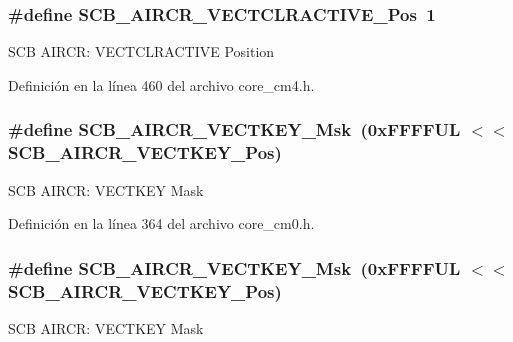 \subsubsection[{\texorpdfstring{S\+C\+B\+\_\+\+A\+I\+R\+C\+R\+\_\+\+V\+E\+C\+T\+C\+L\+R\+A\+C\+T\+I\+V\+E\+\_\+\+Pos}{SCB_AIRCR_VECTCLRACTIVE_Pos}}]{\setlength{\rightskip}{0pt plus 5cm}\#define S\+C\+B\+\_\+\+A\+I\+R\+C\+R\+\_\+\+V\+E\+C\+T\+C\+L\+R\+A\+C\+T\+I\+V\+E\+\_\+\+Pos~1}\hypertarget{group___c_m_s_i_s___s_c_b_gaa30a12e892bb696e61626d71359a9029}{}\label{group___c_m_s_i_s___s_c_b_gaa30a12e892bb696e61626d71359a9029}
S\+CB A\+I\+R\+CR\+: V\+E\+C\+T\+C\+L\+R\+A\+C\+T\+I\+VE Position 

Definición en la línea 460 del archivo core\+\_\+cm4.\+h.

\subsubsection[{\texorpdfstring{S\+C\+B\+\_\+\+A\+I\+R\+C\+R\+\_\+\+V\+E\+C\+T\+K\+E\+Y\+\_\+\+Msk}{SCB_AIRCR_VECTKEY_Msk}}]{\setlength{\rightskip}{0pt plus 5cm}\#define S\+C\+B\+\_\+\+A\+I\+R\+C\+R\+\_\+\+V\+E\+C\+T\+K\+E\+Y\+\_\+\+Msk~(0x\+F\+F\+F\+F\+U\+L $<$$<$ S\+C\+B\+\_\+\+A\+I\+R\+C\+R\+\_\+\+V\+E\+C\+T\+K\+E\+Y\+\_\+\+Pos)}\hypertarget{group___c_m_s_i_s___s_c_b_ga90c7cf0c490e7ae55f9503a7fda1dd22}{}\label{group___c_m_s_i_s___s_c_b_ga90c7cf0c490e7ae55f9503a7fda1dd22}
S\+CB A\+I\+R\+CR\+: V\+E\+C\+T\+K\+EY Mask 

Definición en la línea 364 del archivo core\+\_\+cm0.\+h.

\subsubsection[{\texorpdfstring{S\+C\+B\+\_\+\+A\+I\+R\+C\+R\+\_\+\+V\+E\+C\+T\+K\+E\+Y\+\_\+\+Msk}{SCB_AIRCR_VECTKEY_Msk}}]{\setlength{\rightskip}{0pt plus 5cm}\#define S\+C\+B\+\_\+\+A\+I\+R\+C\+R\+\_\+\+V\+E\+C\+T\+K\+E\+Y\+\_\+\+Msk~(0x\+F\+F\+F\+F\+U\+L $<$$<$ S\+C\+B\+\_\+\+A\+I\+R\+C\+R\+\_\+\+V\+E\+C\+T\+K\+E\+Y\+\_\+\+Pos)}\hypertarget{group___c_m_s_i_s___s_c_b_ga90c7cf0c490e7ae55f9503a7fda1dd22}{}\label{group___c_m_s_i_s___s_c_b_ga90c7cf0c490e7ae55f9503a7fda1dd22}
S\+CB A\+I\+R\+CR\+: V\+E\+C\+T\+K\+EY Mask 

